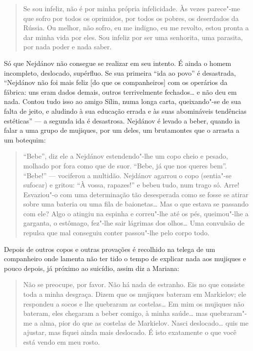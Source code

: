 \begin{quote}
Se sou infeliz, não é por minha própria infelicidade. Às vezes parece"-me
que sofro por todos os oprimidos, por todos os pobres, os deserdados da
Rússia. Ou melhor, não sofro, eu me indigno, eu me revolto, estou pronta
a dar minha vida por eles. Sou infeliz por ser uma senhorita, uma
parasita, por nada poder e nada saber.
\end{quote}

Só que Nejdánov não consegue se realizar em seu intento. É ainda o
homem incompleto, deslocado, supérfluo. Se sua primeira ``ida ao povo''
é desastrada, ``Nejdánov não foi mais feliz [do que os companheiros]
com os operários da fábrica: uns eram dados demais, outros
terrivelmente fechados\ldots{} e não deu em nada. Contou tudo isso ao amigo
Sílin, numa longa carta, queixando"-se de sua falta de jeito, e aludindo
à sua educação errada e às suas abomináveis tendências estéticas'' --- a
segunda ida é desastrosa. Nejdánov é levado a beber, quando ia falar a
uma grupo de mujiques, por um deles, um brutamontes que o arrasta a um
botequim:

\begin{quote}
``Bebe'', diz ele a Nejdánov estendendo"-lhe um copo cheio e pesado, molhado
por fora como que de suor. ``Bebe, já que nos queres bem''. ``Bebe!'' ---
vociferou a multidão. Nejdánov agarrou o copo (sentia"-se sufocar) e
gritou: ``À vossa, rapazes!'' e bebeu tudo, num trago só. Arre! Esvaziou"-o
com uma determinação tão desesperada como se fosse se atirar sobre uma
bateria ou uma fila de baionetas\ldots{} Mas o que estava se passando com
ele? Algo o atingiu na espinha e correu"-lhe até os pés, queimou"-lhe a
garganta, o estômago, fez"-lhe sair lágrimas dos olhos\ldots{} Uma convulsão
de repulsa que mal conseguiu conter passou"-lhe pelo corpo todo.
\end{quote}

Depois de outros copos e outras provações é recolhido na telega de um
companheiro onde lamenta não ter tido o tempo de explicar nada aos
mujiques e pouco depois, já próximo ao suicídio, assim diz a Mariana:

\begin{quote}
Não se preocupe, por favor. Não há nada de estranho. Eis no que consiste
toda a minha desgraça. Dizem que os mujiques bateram em Markielov; ele
respondeu a socos e lhe quebraram as costelas\ldots{} Em mim os mujiques não
bateram, eles chegaram a beber comigo, à minha saúde\ldots{} mas quebraram"-me
a alma, pior do que as costelas de Markielov. Nasci deslocado\ldots{} quis me
ajustar, mas fiquei ainda mais deslocado. É isto exatamente o que você
está vendo em meu rosto.
\end{quote}

